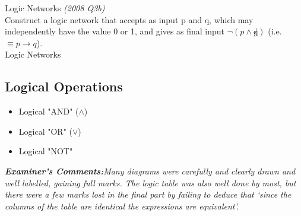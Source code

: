 
{Logic Networks }
\emph{(2008 Q3b)}\\
Construct a logic network that accepts as input p and q, which may independently have the value 0 or 1, and
gives as final input $\neg(p \wedge \not q)$ (i.e. $\equiv p \rightarrow q$).\\

{Logic Networks }

\subsection{Logical Operations}

\begin{itemize}
\item Logical "AND" ($\wedge$)
\item Logical "OR" ($\vee$)
\item Logical "NOT" 
\end{itemize}

\emph{\textbf{Examiner's Comments:}Many
diagrams were carefully and clearly drawn and well labelled, gaining full
marks. The logic table was also well done by most, but there were a few marks
lost in the final part by failing to deduce that ‘since the columns of the table are
identical the expressions are equivalent’.}



